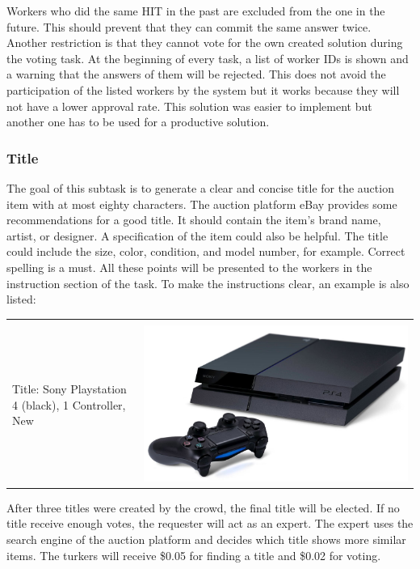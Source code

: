 Workers who did the same HIT in the past are excluded from the one in the future. This should prevent that they can commit the same answer twice. Another restriction is that they cannot vote for the own created solution during the voting task. At the beginning of every task, a list of worker IDs is shown and a warning that the answers of them will be rejected. This does not avoid the participation of the listed workers by the system but it works because they will not have a lower approval rate. This solution was easier to implement but another one has to be used for a productive solution.
\subsubsection{Title}
The goal of this subtask is to generate a clear and concise title for the auction item with at most eighty characters. The auction platform eBay provides some recommendations for a good title. It should contain the item's brand name, artist, or designer. A specification of the item could also be helpful. The title could include the size, color, condition, and model number, for example. Correct spelling is a must. All these points will be presented to the workers in the instruction section of the task. To make the instructions clear, an example is also listed:
\clearpage
\begin{table}[h!]
	\begin{center}
	\begin{tabular}{| p{8cm} p{5cm} |}
		\hline
		& \\
		Title: Sony Playstation 4 (black), 1 Controller, New & \includegraphics[scale=0.1]{images/ps4} \\
		\hline
	\end{tabular}
	\end{center}
\end{table}
After three titles were created by the crowd, the final title will be elected. If no title receive enough votes, the requester will act as an expert. The expert uses the search engine of the auction platform and decides which title shows more similar items. The turkers will receive \$0.05 for finding a title and \$0.02 for voting.
